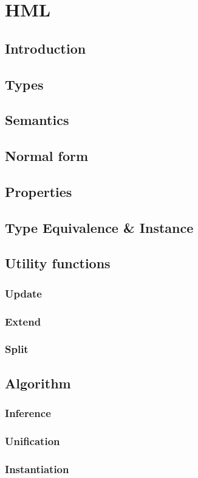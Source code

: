 \chapter{HML}
\section{Introduction}
\section{Types}
\section{Semantics}
\section{Normal form}
\section{Properties}
\section{Type Equivalence \& Instance}
\section{Utility functions}
\subsection{Update}
\subsection{Extend}
\subsection{Split}
\section{Algorithm}
\subsection{Inference}
\subsection{Unification}
\subsection{Instantiation}

